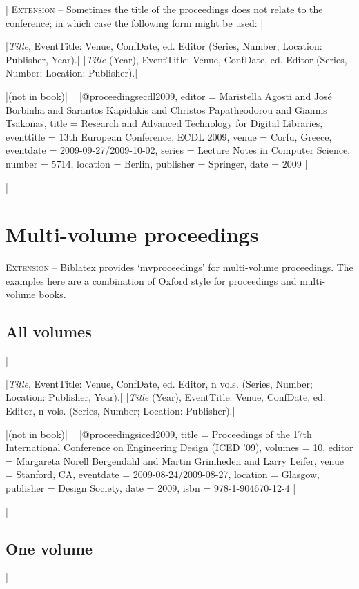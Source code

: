 \documentclass[extrafontsizes,11pt,a4paper,oneside]{memoir}
\newcommand*{\lit}[1]{\textsf{#1}}
\newcommand*{\code}[1]{`\textsf{#1}'}
\begin{document}
\todoc|
\textsc{Extension} – Sometimes the title of the proceedings does not relate to the conference; in which case the following form might be used:
|

\specs
|\emph{Title}, EventTitle: Venue, ConfDate, \lit{ed.} Editor (Series, Number; Location: Publisher, Year).|%
|\emph{Title} (Year), EventTitle: Venue, ConfDate, \lit{ed.} Editor (Series, Number; Location: Publisher).|

\bibexample
|(not in book)|%
||%
|@proceedings{ecdl2009,
  editor = {Maristella Agosti and José Borbinha and Sarantos Kapidakis and Christos Papatheodorou and Giannis Tsakonas},
  title = {Research and Advanced Technology for Digital Libraries},
  eventtitle = {13th European Conference, ECDL 2009},
  venue = {Corfu, Greece},
  eventdate = {2009-09-27/2009-10-02},
  series = {Lecture Notes in Computer Science},
  number = {5714},
  location = {Berlin},
  publisher = {Springer},
  date = {2009}
}|

\todoc|
\section{Multi-volume proceedings}

\textsc{Extension} – Biblatex provides \code{mvproceedings} for multi-volume proceedings.
The examples here are a combination of Oxford style for proceedings and multi-volume books.

\subsection{All volumes}
|

\specs
|\emph{Title}, EventTitle: Venue, ConfDate, \lit{ed.} Editor, n \lit{vols.} (Series, Number; Location: Publisher, Year).|%
|\emph{Title} (Year), EventTitle: Venue, ConfDate, \lit{ed.} Editor, n \lit{vols.} (Series, Number; Location: Publisher).|

\bibexample
|(not in book)|%
||%
|@proceedings{iced2009,
  title = {Proceedings of the 17th International Conference on Engineering Design (ICED ’09)},
  volumes = {10},
  editor = {Margareta Norell Bergendahl and Martin Grimheden and Larry Leifer},
  venue = {Stanford, CA},
  eventdate = {2009-08-24/2009-08-27},
  location = {Glasgow},
  publisher = {Design Society},
  date = {2009},
  isbn = {978-1-904670-12-4}
}|

\todoc|
\subsection{One volume}
|
\end{document}
